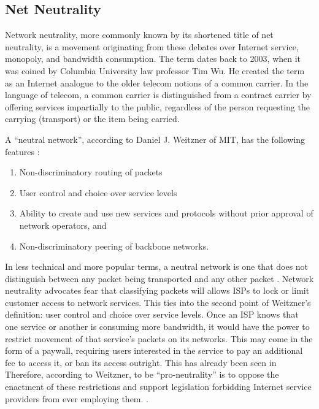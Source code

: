 \documentclass[journal]{IEEEtran}
\begin{document}
\subsection{Net Neutrality}
Network neutrality, more commonly known by its shortened title of net neutrality, is a movement originating from these debates over Internet service, monopoly, and bandwidth consumption. The term dates back to 2003, when it was coined by Columbia University law professor Tim Wu\cite{wu03}. He created the term as an Internet analogue to the older telecom notions of a common carrier. In the language of telecom, a common carrier is distinguished from a contract carrier by offering services impartially to the public, regardless of the person requesting the carrying (transport) or the item being carried.

A \enquote{neutral network}, according to Daniel J. Weitzner of MIT, has the following features \cite{weitzner06}:
\begin{enumerate}
    \item Non-discriminatory routing of packets
    \item User control and choice over service levels
    \item Ability to create and use new services and protocols without prior approval of network operators, and
    \item Non-discriminatory peering of backbone networks.
\end{enumerate}

In less technical and more popular terms, a neutral network is one that does not distinguish between any packet being transported and any other packet \cite{wirednetneutrality}. Network neutrality advocates fear that classifying packets will allows ISPs to lock or limit customer access to network services. This ties into the second point of Weitzner's definition: user control and choice over service levels. Once an ISP knows that one service or another is consuming more bandwidth, it would have the power to restrict movement of that service's packets on its networks. This may come in the form of a paywall, requiring users interested in the service to pay an additional fee to access it, or ban its access outright. This has already been seen in Therefore, according to Weitzner, to be \enquote{pro-neutrality} is to oppose the enactment of these restrictions and support legislation forbidding Internet service providers from ever employing them. \cite{weitzner07}.
\end{document}
